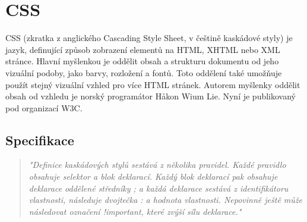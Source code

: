 \documentclass[main.tex]{subfiles}
\begin{document}
\section{CSS}
CSS (zkratka z anglického Cascading Style Sheet, v češtině kaskádové styly) je jazyk, definující způsob zobrazení elementů na HTML, XHTML nebo XML stránce. Hlavní myšlenkou je oddělit obsah a strukturu dokumentu od jeho vizuální podoby, jako barvy, rozložení a fontů. Toto oddělení také umožňuje použít stejný vizuální vzhled pro více HTML stránek. Autorem myšlenky oddělit obsah od vzhledu je norský programátor Håkon Wium Lie. Nyní je publikovaný pod organizací W3C.  

\subsection{Specifikace}
\begin{quote} \textit{"Definice kaskádových stylů sestává z několika pravidel. Každé pravidlo obsahuje selektor a blok deklarací. Každý blok deklarací pak obsahuje deklarace oddělené středníky ; a každá deklarace sestává z identifikátoru vlastnosti, následuje dvojtečka : a hodnota vlastnosti. Nepovinně ještě může následovat označení !important, které zvýší sílu deklarace."} \cite{web:wik:cz:css} \end{quote} 
\end{document}

